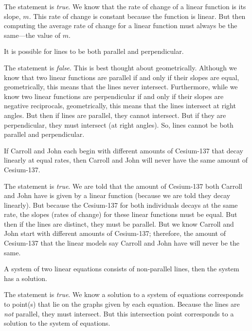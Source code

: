 \documentclass[11pt,letterpaper]{article}
\begin{document}
\sol The statement is \textit{true}. We know that the rate of change of a linear function is its slope, $m$. This rate of change is constant because the function is linear. But then computing the average rate of change for a linear function must always be the same---the value of $m$. \pvspace{1.3cm}



 It is possible for lines to be both parallel and perpendicular. \pspace

\sol The statement is \textit{false}. This is best thought about geometrically. Although we know that two linear functions are parallel if and only if their slopes are equal, geometrically, this means that the lines never intersect. Furthermore, while we know two linear functions are perpendicular if and only if their slopes are negative reciprocals, geometrically, this means that the lines intersect at right angles. But then if lines are parallel, they cannot intersect. But if they are perpendicular, they must intersect (at right angles). So, lines cannot be both parallel and perpendicular. \pvspace{1.3cm}



 If Carroll and John each begin with different amounts of Cesium-137 that decay linearly at equal rates, then Carroll and John will never have the same amount of Cesium-137. \pspace

\sol The statement is \textit{true}. We are told that the amount of Cesium-137 both Carroll and John have is given by a linear function (because we are told they decay linearly). But because the Cesium-137 for both individuals decays at the same rate, the slopes (rates of change) for these linear functions must be equal. But then if the lines are distinct, they must be parallel. But we know Carroll and John start with different amounts of Cesium-137; therefore, the amount of Cesium-137 that the linear models say Carroll and John have will never be the same. \pvspace{1.3cm}



 A system of two linear equations consists of non-parallel lines, then the system has a solution. \pspace

\sol The statement is \textit{true}. We know a solution to a system of equations corresponds to point(s) that lie on the graphs given by each equation. Because the lines are \textit{not} parallel, they must intersect. But this intersection point corresponds to a solution to the system of equations. \pvspace{1.3cm}
\end{document}
